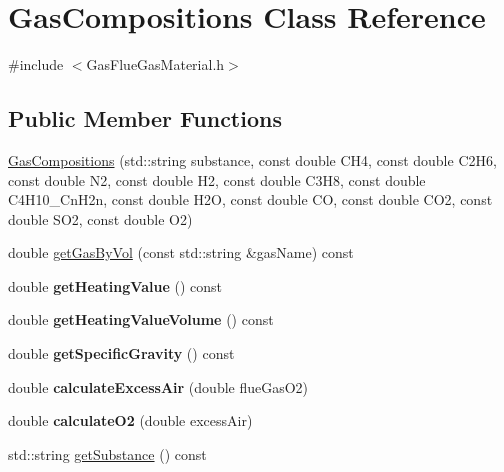\hypertarget{class_gas_compositions}{}\section{Gas\+Compositions Class Reference}
\label{class_gas_compositions}


{\ttfamily \#include $<$Gas\+Flue\+Gas\+Material.\+h$>$}

\subsection*{Public Member Functions}
\begin{DoxyCompactItemize}
\item 
\hyperlink{class_gas_compositions_ad0021d4285883374f8904f9465e41920}{Gas\+Compositions} (std\+::string substance, const double C\+H4, const double C2\+H6, const double N2, const double H2, const double C3\+H8, const double C4\+H10\+\_\+\+Cn\+H2n, const double H2O, const double CO, const double C\+O2, const double S\+O2, const double O2)
\item 
double \hyperlink{class_gas_compositions_a2028a42c136e057a6153b7bfa68d63e6}{get\+Gas\+By\+Vol} (const std\+::string \&gas\+Name) const
\item 
\mbox{\label{class_gas_compositions_a7ebcdf1c991bd70f28eb845e45d62afd}} 
double {\bfseries get\+Heating\+Value} () const
\item 
\mbox{\label{class_gas_compositions_a78803a5c2508df3fd679dca0eb378480}} 
double {\bfseries get\+Heating\+Value\+Volume} () const
\item 
\mbox{\label{class_gas_compositions_a4f891acb4f8dc3992703155c6ba7ccb0}} 
double {\bfseries get\+Specific\+Gravity} () const
\item 
\mbox{\label{class_gas_compositions_a4f6408254477960648440da460099e2d}} 
double {\bfseries calculate\+Excess\+Air} (double flue\+Gas\+O2)
\item 
\mbox{\label{class_gas_compositions_afc573b87fb7e7b99803b22470c402592}} 
double {\bfseries calculate\+O2} (double excess\+Air)
\item 
std\+::string \hyperlink{class_gas_compositions_abad9554bca9b68cd970eae11bdd3c505}{get\+Substance} () const

\end{DoxyCompactItemize}
